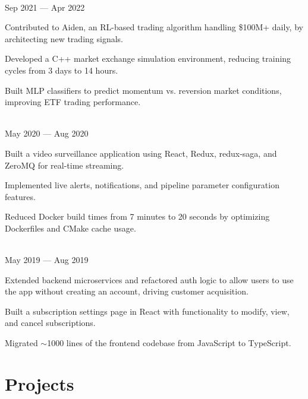 \documentclass[letterpaper,11pt]{hieudo-build}
\begin{document}
 \hfill {} \\
 \hfill Sep 2021 — Apr 2022 \\
\begin{tightemize}
  \item Contributed to Aiden, an RL-based trading algorithm handling \$100M+ daily, by architecting new trading signals.
  \item Developed a C++ market exchange simulation environment, reducing training cycles from 3 days to 14 hours.
  \item Built MLP classifiers to predict momentum vs. reversion market conditions, improving ETF trading performance.
\end{tightemize}

 \hfill {} \\
 \hfill May 2020 — Aug 2020 \\
\begin{tightemize}
  \item Built a video surveillance application using React, Redux, redux-saga, and ZeroMQ for real-time streaming.
  \item Implemented live alerts, notifications, and pipeline parameter configuration features.
  \item Reduced Docker build times from 7 minutes to 20 seconds by optimizing Dockerfiles and CMake cache usage.
\end{tightemize}

 \hfill {} \\
 \hfill May 2019 — Aug 2019 \\
\begin{tightemize}
  \item Extended backend microservices and refactored auth logic to allow users to use the app without creating an account, driving customer acquisition.
  \item Built a subscription settings page in React with functionality to modify, view, and cancel subscriptions.
  \item Migrated $\sim$1000 lines of the frontend codebase from JavaScript to TypeScript.
\end{tightemize}


\section{Projects}
\end{document}
